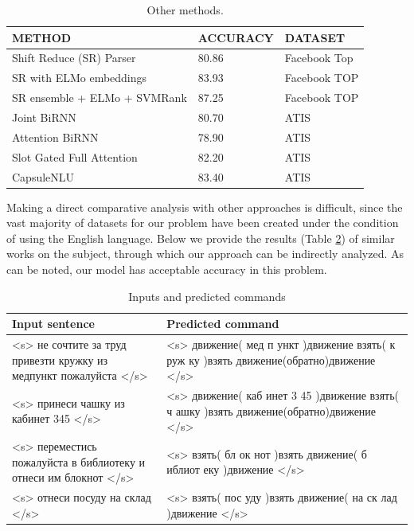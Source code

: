 \documentclass{article}
\begin{document}
\begin{table}[!tbh]
\begin{center}
\begin{tabular}{ | l | l | l | }
\hline
\textbf{METHOD}  & \textbf{ACCURACY} & \textbf{DATASET}\\ \hline
Shift Reduce (SR) Parser & 80.86 & Facebook Top \\
SR with ELMo embeddings & 83.93 & Facebook TOP \\
SR ensemble + ELMo + SVMRank & 87.25 & Facebook TOP \\
Joint BiRNN & 80.70 & ATIS \\
Attention BiRNN & 78.90 & ATIS \\
Slot Gated Full Attention & 82.20 & ATIS \\
CapsuleNLU & 83.40 & ATIS \\
\hline
\end{tabular}
\caption{Other methods.}
\label{tab:methods}
\end{center}
\end{table}

Making a direct comparative analysis with other approaches is difficult, since the vast majority of datasets for our problem have been created under the condition of using the English language. Below we provide the results (Table \ref{tab:methods}) of similar works on the subject, through which our approach can be indirectly analyzed. As can be noted, our model has acceptable accuracy in this problem.

\begin{table}[!tbh]
\begin{center}
\begin{tabular}{ | p{5cm} | p{6cm} |}
\hline
\textbf{Input sentence}  & \textbf{Predicted command} \\ \hline
<s> не сочтите за труд привезти кружку из медпункт пожалуйста </s> & <s> движение( мед п ункт )движение взять( к руж ку )взять движение(обратно)движение </s> \\
\hline
<s> принеси чашку из кабинет 345 </s> & <s> движение( каб инет 3 45 )движение взять( ч ашку )взять движение(обратно)движение </s> \\
\hline
<s> переместись пожалуйста в библиотеку и отнеси им блокнот </s> & <s> взять( бл ок нот )взять движение( б иблиот еку )движение </s> \\
\hline
<s> отнеси посуду на склад </s> & <s> взять( пос уду )взять движение( на ск лад )движение </s> \\
\hline
\end{tabular}
\caption{Inputs and predicted commands}
\label{tab:methods}
\end{center}
\end{table}
\end{document}
